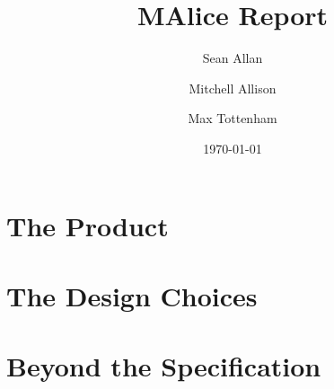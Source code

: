 \documentclass[a4wide, 11pt]{article}
\begin{document}
\title{MAlice Report}

\author{Sean Allan \and Mitchell Allison \and Max Tottenham}

\date{\today}         %

\maketitle            %

\section{The Product}

\section{The Design Choices}

\section{Beyond the Specification}

\enddocument
\end{document}
